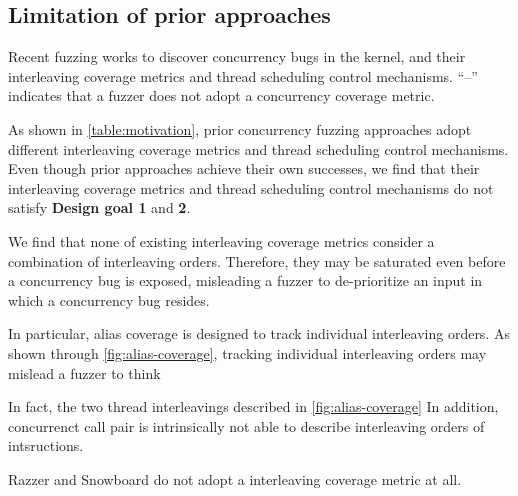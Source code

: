%


\subsection{Limitation of prior approaches}
\label{ss:existingapproaches}

\begin{table}[t]
  \centering
  
  \caption{Recent fuzzing works to discover concurrency bugs in the
    kernel, and their interleaving coverage metrics and thread
    scheduling control mechanisms. ``--'' indicates that a fuzzer
    does not adopt a concurrency coverage metric.}
  \label{table:motivation}
\end{table}

As shown in \autoref{table:motivation}, prior concurrency fuzzing
approaches adopt different interleaving coverage metrics and thread
scheduling control mechanisms.
%
Even though prior approaches achieve their own successes, we find that
their interleaving coverage metrics and thread scheduling control
mechanisms do not satisfy \textbf{Design goal 1} and \textbf{2}.


%
We find that none of existing interleaving coverage metrics consider
a combination of interleaving orders.
%
Therefore, they may be saturated even before a concurrency bug is
exposed, misleading a fuzzer to de-prioritize an input in which a
concurrency bug resides.


In particular, alias coverage is designed to track individual
interleaving orders. As shown through \autoref{fig:alias-coverage},
tracking individual interleaving orders may mislead a fuzzer to think

%
In fact, the two thread interleavings described in
\autoref{fig:alias-coverage}
%
In addition, concurrenct call pair is intrinsically not able to
describe interleaving orders of intsructions.

Razzer and Snowboard do not adopt a interleaving coverage metric at
all.



